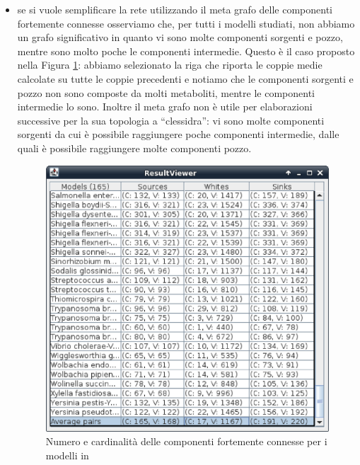 \begin{itemize}
\item se si vuole semplificare la rete utilizzando il meta grafo delle
  componenti fortemente connesse osserviamo che, per tutti i modelli
  studiati, non abbiamo un grafo significativo in quanto vi sono molte
  componenti sorgenti e pozzo, mentre sono molto poche le componenti
  intermedie. Questo \`e il caso proposto nella Figura
  \ref{fig:ResultViewer-SCC-composition}: abbiamo selezionato la riga
  che riporta le coppie medie calcolate su tutte le coppie precedenti
  e notiamo che le componenti sorgenti e pozzo non sono composte da
  molti metaboliti, mentre le componenti intermedie lo sono. Inoltre
  il meta grafo non \`e utile per elaborazioni successive per la sua
  topologia a ``clessidra'': vi sono molte componenti sorgenti da cui
  \`e possibile raggiungere poche componenti intermedie, dalle quali
  \`e possibile raggiungere molte componenti pozzo.
  \begin{figure}
    \centering
    \includegraphics[scale=.7]{images/ResultViewer-table-with-average-row-selected}
    \caption{Numero e cardinalit\`a delle componenti fortemente connesse per i modelli in \cite{MetExplore}}
    \label{fig:ResultViewer-SCC-composition}
  \end{figure}
\end{itemize}
